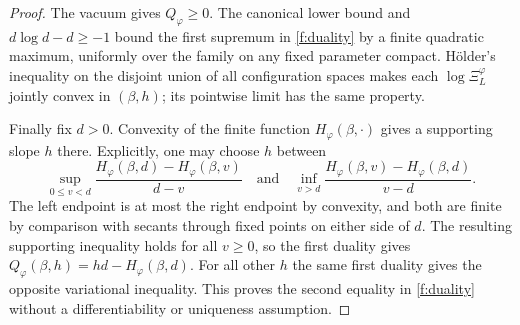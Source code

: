 \begin{proof}
The vacuum gives $Q_\varphi\ge0$.  The canonical lower bound and
$d\log d-d\ge-1$ bound the first supremum in \eqref{f:duality} by a
finite quadratic maximum, uniformly over the family on any fixed
parameter compact.  H\"older's inequality on the disjoint union of
all configuration spaces makes each $\log\Xi^\varphi_L$ jointly
convex in $(\beta,h)$; its pointwise limit has the same property.

Finally fix $d>0$.  Convexity of the finite function
$H_\varphi(\beta,\cdot)$ gives a supporting slope $h$ there.  Explicitly,
one may choose $h$ between
\[
 \sup_{0\le v<d}\frac{H_\varphi(\beta,d)-H_\varphi(\beta,v)}{d-v}
 \quad\text{and}\quad
 \inf_{v>d}\frac{H_\varphi(\beta,v)-H_\varphi(\beta,d)}{v-d}.
\]
The left endpoint is at most the right endpoint by convexity, and
both are finite by comparison with secants through fixed points on
either side of $d$.  The resulting supporting inequality holds for
all $v\ge0$, so the first duality gives
$Q_\varphi(\beta,h)=hd-H_\varphi(\beta,d)$.  For all other $h$ the
same first duality gives the opposite variational inequality.  This
proves the second equality in \eqref{f:duality} without a differentiability
or uniqueness assumption.
\end{proof}
